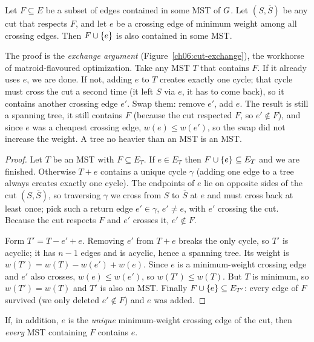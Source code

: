 \begin{theorem}
\label{ch06:cut-property}
Let $F\subseteq E$ be a subset of edges contained in some MST of $G$. Let $(S,\overline S)$ be any cut that respects $F$, and let $e$ be a crossing edge of minimum weight among all crossing edges. Then $F\cup\{e\}$ is also contained in some MST.
\end{theorem}

\begin{whybox}
The proof is the \emph{exchange argument} (Figure~\ref{ch06:cut-exchange}), the workhorse of matroid-flavoured optimization. Take any MST $T$ that contains $F$. If it already uses $e$, we are done. If not, adding $e$ to $T$ creates exactly one cycle; that cycle must cross the cut a second time (it left $S$ via $e$, it has to come back), so it contains another crossing edge $e'$. Swap them: remove $e'$, add $e$. The result is still a spanning tree, it still contains $F$ (because the cut respected $F$, so $e'\notin F$), and since $e$ was a cheapest crossing edge, $w(e)\le w(e')$, so the swap did not increase the weight. A tree no heavier than an MST is an MST.
\end{whybox}

\begin{proof}
Let $T$ be an MST with $F\subseteq E_T$. If $e\in E_T$ then $F\cup\{e\}\subseteq E_T$ and we are finished. Otherwise $T+e$ contains a unique cycle $\gamma$ (adding one edge to a tree always creates exactly one cycle). The endpoints of $e$ lie on opposite sides of the cut $(S,\overline S)$, so traversing $\gamma$ we cross from $S$ to $\overline S$ at $e$ and must cross back at least once; pick such a return edge $e'\in\gamma$, $e'\ne e$, with $e'$ crossing the cut. Because the cut respects $F$ and $e'$ crosses it, $e'\notin F$.

Form $T'=T-e'+e$. Removing $e'$ from $T+e$ breaks the only cycle, so $T'$ is acyclic; it has $n-1$ edges and is acyclic, hence a spanning tree. Its weight is $w(T')=w(T)-w(e')+w(e)$. Since $e$ is a minimum-weight crossing edge and $e'$ also crosses, $w(e)\le w(e')$, so $w(T')\le w(T)$. But $T$ is minimum, so $w(T')=w(T)$ and $T'$ is also an MST. Finally $F\cup\{e\}\subseteq E_{T'}$: every edge of $F$ survived (we only deleted $e'\notin F$) and $e$ was added.
\end{proof}

\begin{corollary}
\label{ch06:cut-sharp}
If, in addition, $e$ is the \emph{unique} minimum-weight crossing edge of the cut, then \emph{every} MST containing $F$ contains $e$.
\end{corollary}

